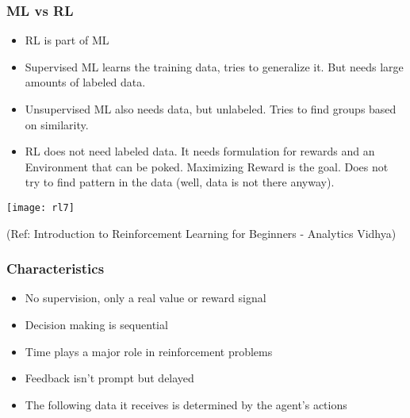 \begin{frame}[fragile]\frametitle{ML vs RL}

\begin{itemize}
\item RL is part of ML
\item Supervised ML learns the training data, tries to generalize it. But needs large amounts of labeled data.
\item Unsupervised ML also needs data, but unlabeled. Tries to find groups based on similarity.
\item RL does not need labeled data. It needs formulation for rewards and an Environment that can be poked. Maximizing Reward is the goal. Does not try to find pattern in the data (well, data is not there anyway).
\end{itemize}

\begin{center}
\texttt{[image: rl7]}
\end{center}

{\tiny (Ref: Introduction to Reinforcement Learning for Beginners - Analytics Vidhya)} 

\end{frame}

\begin{frame}[fragile]\frametitle{Characteristics}
\begin{itemize}
\item No supervision, only a real value or reward signal
\item Decision making is sequential
\item Time plays a major role in reinforcement problems
\item Feedback isn’t prompt but delayed
\item The following data it receives is determined by the agent’s actions
\end{itemize}
\end{frame}


